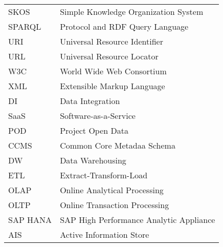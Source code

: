 \begin{longtable}{lp{9cm}}
 SKOS &  Simple Knowledge Organization System \\
 SPARQL & Protocol and RDF Query Language \\
 URI & Universal Resource Identifier \\
 URL & Universal Resource Locator \\
 W3C & World Wide Web Consortium \\
 XML & Extensible Markup Language \\
 DI & Data Integration \\
 SaaS & Software-as-a-Service \\
 POD & Project Open Data \\
 CCMS & Common Core Metadaa Schema \\
 DW & Data Warehousing \\
 ETL & Extract-Transform-Load \\
 OLAP & Online Analytical Processing \\
 OLTP & Online Transaction Processing \\
 SAP HANA & SAP High Performance Analytic Appliance \\
 AIS & Active Information Store
\end{longtable}

